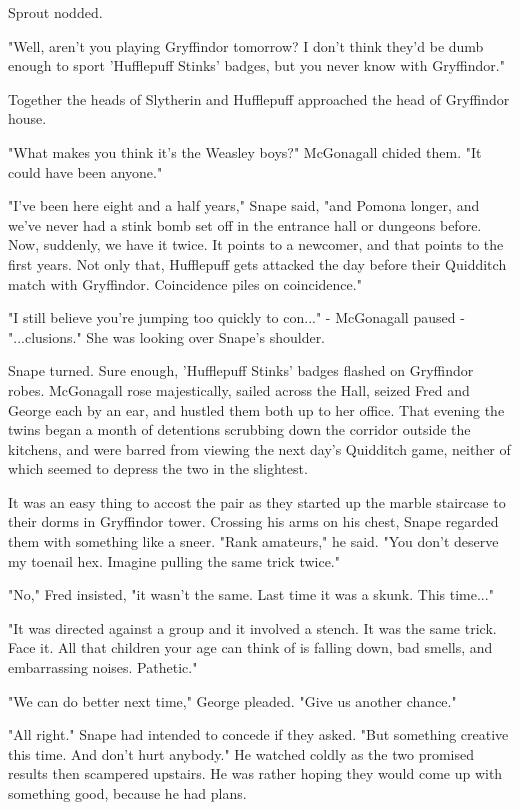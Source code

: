 \documentclass[a4paper,11pt]{article}
\begin{document}
Sprout nodded.

"Well, aren't you playing Gryffindor tomorrow? I don't think they'd be dumb enough to sport 'Hufflepuff Stinks' badges, but you never know with Gryffindor."

Together the heads of Slytherin and Hufflepuff approached the head of Gryffindor house.

"What makes you think it's the Weasley boys?" McGonagall chided them. "It could have been anyone."

"I've been here eight and a half years," Snape said, "and Pomona longer, and we've never had a stink bomb set off in the entrance hall or dungeons before. Now, suddenly, we have it twice. It points to a newcomer, and that points to the first years. Not only that, Hufflepuff gets attacked the day before their Quidditch match with Gryffindor. Coincidence piles on coincidence."

"I still believe you're jumping too quickly to con..." - McGonagall paused - "...clusions." She was looking over Snape's shoulder.

Snape turned. Sure enough, 'Hufflepuff Stinks' badges flashed on Gryffindor robes. McGonagall rose majestically, sailed across the Hall, seized Fred and George each by an ear, and hustled them both up to her office. That evening the twins began a month of detentions scrubbing down the corridor outside the kitchens, and were barred from viewing the next day's Quidditch game, neither of which seemed to depress the two in the slightest.

It was an easy thing to accost the pair as they started up the marble staircase to their dorms in Gryffindor tower. Crossing his arms on his chest, Snape regarded them with something like a sneer. "Rank amateurs," he said. "You don't deserve my toenail hex. Imagine pulling the same trick twice."

"No," Fred insisted, "it wasn't the same. Last time it was a skunk. This time..."

"It was directed against a group and it involved a stench. It was the same trick. Face it. All that children your age can think of is falling down, bad smells, and embarrassing noises. Pathetic."

"We can do better next time," George pleaded. "Give us another chance."

"All right." Snape had intended to concede if they asked. "But something creative this time. And don't hurt anybody." He watched coldly as the two promised results then scampered upstairs. He was rather hoping they would come up with something good, because he had plans.
\end{document}
